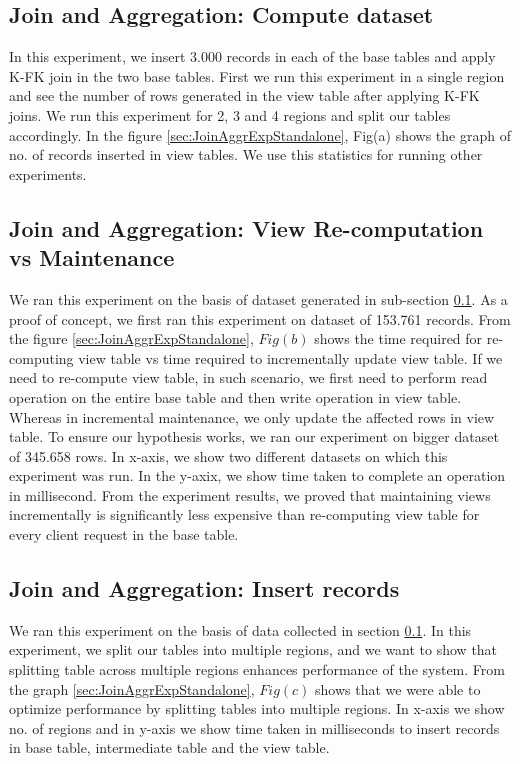 \documentclass[11pt,a4paper,bibtotoc,idxtotoc,headsepline,footsepline,footexclude,BCOR12mm,DIV13]{scrbook}
\begin{document}
\subsection{Join and Aggregation: Compute dataset}
\label{Join and Aggregation: Insert records Standalone}

In this experiment, we insert 3.000 records in each of the base tables and apply K-FK join in the two base tables. First we run this experiment in a single region and see the number of rows generated in the view table after applying K-FK joins. We run this experiment for 2, 3 and 4 regions and split our tables accordingly. In the figure \ref{sec:JoinAggrExpStandalone}, Fig(a) shows the graph of no. of records inserted in view tables. We use this statistics for running other experiments.

\subsection{Join and Aggregation: View Re-computation vs Maintenance}
\label{Join and Aggregation: View Re-computation vs Maintenance Standalone}

We ran this experiment on the basis of dataset generated in sub-section \ref{Join and Aggregation: Insert records Standalone}. As a proof of concept, we first ran this experiment on dataset of 153.761 records. From the figure \ref{sec:JoinAggrExpStandalone}, $Fig(b)$ shows the time required for re-computing view table vs time required to incrementally update view table. If we need to re-compute view table, in such scenario, we first need to perform read operation on the entire base table and then write operation in view table. Whereas in incremental maintenance, we only update the affected rows in view table. To ensure our hypothesis works, we ran our experiment on bigger dataset of 345.658 rows. In x-axis, we show two different datasets on which this experiment was run. In the y-axix, we show time taken to complete an operation in millisecond. From the experiment results, we proved that maintaining views incrementally is significantly less expensive than re-computing view table for every client request in the base table.

\subsection{Join and Aggregation: Insert records}
\label{Join and Aggregation: Insert Records Standalone}

We ran this experiment on the basis of data collected in section \ref{Join and Aggregation: Insert records Standalone}. In this experiment, we split our tables into multiple regions, and we want to show that splitting table across multiple regions enhances performance of the system. From the graph \ref{sec:JoinAggrExpStandalone}, $Fig(c)$ shows that we were able to optimize performance by splitting tables into multiple regions. In x-axis we show no. of regions and in y-axis we show time taken in milliseconds to insert records in base table, intermediate table and the view table. 
\end{document}
